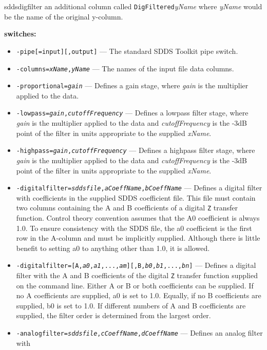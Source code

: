 \begin{sddsprog}{sddsdigfilter}
    an additional column called {\tt DigFiltered}{\em yName} where {\em yName} would be the name of the original y-column.
  \item \textbf{switches:}
    \begin{itemize}
      \item {\tt -pipe[=input][,output]} --- The standard SDDS Toolkit pipe switch.
      \item {\tt -columns={\em xName},{\em yName}} --- The names of the input file data columns.
      \item {\tt -proportional={\em gain}} --- Defines a gain stage, where {\em gain} is the multiplier applied to the data.
      \item {\tt -lowpass={\em gain},{\em cutoffFrequency}} --- Defines a lowpass filter stage, where {\em gain} is the
        multiplier applied to the data and {\em cutoffFrequency} is the -3dB point of the filter in units appropriate to the
        supplied {\em xName}.
      \item {\tt -highpass={\em gain},{\em cutoffFrequency}} --- Defines a highpass filter stage, where {\em gain} is the
        multiplier applied to the data and {\em cutoffFrequency} is the -3dB point of the filter in units appropriate to the
        supplied {\em xName}.
      \item {\tt -digitalfilter={\em sddsfile},{\em aCoeffName},{\em bCoeffName}} --- Defines a digital filter with
        coefficients in the supplied SDDS coefficient file. This file must contain two columns containing the A and B
        coefficients of a digital \verb|Z| transfer function. Control theory convention assumes that the A0 coefficient is
        always 1.0. To ensure consistency with the SDDS file, the a0 coefficient is the first row in the A-column and must be
        implicitly supplied. Although there is little benefit to setting a0 to anything other than 1.0, it is allowed.
      \item {\tt -digitalfilter=[A,{\em a0},{\em a1},...,{\em am}][,B,{\em b0},{\em b1},...,{\em bn}]} --- Defines a digital
        filter with the A and B coefficients of the digital \verb|Z| transfer function supplied on the command line. Either A or
        B or both coefficients can be supplied. If no A coefficients are supplied, a0 is set to 1.0. Equally, if no B
        coefficients are supplied, b0 is set to 1.0. If different numbers of A and B coefficients are supplied, the filter order
        is determined from the largest order.
      \item {\tt -analogfilter={\em sddsfile},{\em cCoeffName},{\em dCoeffName}} --- Defines an analog filter with

\end{itemize}
\end{sddsprog}
